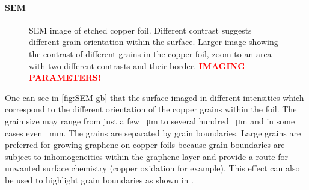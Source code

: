 \paragraph{SEM}
\label{sec:foil-SEM}


\begin{figure}[] \centering
	 \quad
	\caption{SEM image of etched copper foil. Different contrast suggests different grain-orientation within the surface.  Larger image showing the contrast of different grains in the copper-foil,  zoom to an area with two different contrasts and their border. \textcolor{red}{\textbf{IMAGING PARAMETERS!}}}
	\label{fig:SEM-gb}
\end{figure}

One can see in \autoref{fig:SEM-gb} that the surface imaged in different intensities which correspond to the different orientation of the copper grains within the foil\cite{wu_effects_2015}. The grain size may range from just a few \SI{}{\micro \meter} to several hundred \SI{}{\micro \meter} and in some cases even \SI{}{\milli \meter}. The grains are separated by grain boundaries. Large grains are preferred for growing graphene on copper foils because grain boundaries are subject to inhomogeneities within the graphene layer and provide a route for unwanted surface chemistry (copper oxidation for example). This effect can also be used to highlight grain boundaries as shown in \cite{wu_effects_2015}.

